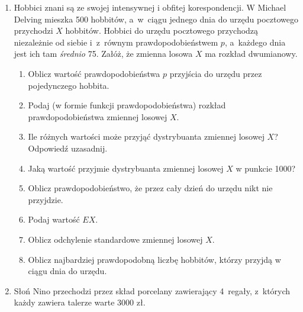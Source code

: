 \documentclass[twoside]{mwart}
\newcommand{\ans}[1]{}
\newcommand{\ans}[1]{\par\emph{Odpowiedź:} #1}
\begin{document}
\begin{enumerate}
\begin{enumerate}
\end{enumerate}
\item Hobbici znani są ze swojej intensywnej i obfitej korespondencji. W Michael
Delving mieszka 500 hobbitów, a~w~ciągu jednego dnia do urzędu pocztowego
przychodzi $X$ hobbitów. Hobbici do urzędu pocztowego przychodzą niezależnie od
siebie i~z~równym prawdopodobieństwem $p$, a~każdego dnia jest ich tam
\emph{średnio} 75. Załóż, że zmienna losowa $X$ ma rozkład dwumianowy.
\begin{enumerate}
\item Oblicz wartość prawdopodobieństwa $p$ przyjścia do urzędu przez pojedynczego hobbita.
\ans{
	Hobbici przychodzą niezależnie i z równym prawdopodobieństwem, jest ich też stała liczba $n=500$, a zatem mamy do czynienia z modelem rozkładu dwumianowego. Znamy średnią, więc łatwo obliczyć prawdopodobieństwo:
	\[ p=\frac{EX}{n}=\frac{75}{500}=\frac{3}{20} \]
}
\item Podaj  (w formie funkcji prawdopodobieństwa) rozkład prawdopodobieństwa zmiennej losowej $X$.
\ans{
	\[ P(X=k)={500 \choose k}\left(\frac{3}{20}\right)^k\left(\frac{17}{20}\right)^{500-k} k\in\{0,1,\ldots,500\} \]
}
\item Ile różnych wartości może przyjąć dystrybuanta zmiennej losowej $X$? Odpowiedź uzasadnij.
\ans{
	Mamy 500 hobbitów, a zatem 501 punktów skokowych (0 do 500). Dystrybuanta zmiennej losowej typu skokowego rośnie w każdym punkcie skokowym, zatem mamy 501 wzrostów. Żeby mieć 501 wzrostów musimy mieć 502 różne wartości.
}
\item Jaką wartość przyjmie dystrybuanta zmiennej losowej $X$ w punkcie 1000?
\ans{
	\[F(1000)=P(X\leq 1000)=1\]
}
\item Oblicz prawdopodobieństwo, że przez cały dzień do urzędu nikt nie przyjdzie.
\ans{
	\[ P(X=0)=\left(\frac{17}{20}\right)^{500} \approx 0 \]
}
\item Podaj wartość $EX$.
\ans{
	\[ EX=75 \] (wystarczy przepisać z treści zadania)
}
\item Oblicz odchylenie standardowe zmiennej losowej $X$.
\ans{
	\[ DX=\sqrt{np(1-p)}=\sqrt{500\cdot\frac{3}{20}\cdot\frac{17}{20}}\approx 7{,}98 \]
}
\item Oblicz najbardziej prawdopodobną liczbę hobbitów, którzy przyjdą w ciągu dnia do urzędu.
\ans{
	Iloczyn $(n+1)p$ nie jest liczbą całkowitą, zatem bierzemy z niego podłogę:
	\[\lfloor(n+1)p\rfloor = 75 \]
}
\end{enumerate}
\item Słoń Nino przechodzi przez skład porcelany zawierający 4~regały, z~których każdy zawiera talerze warte 3000 zł.

\end{enumerate}
\end{document}
